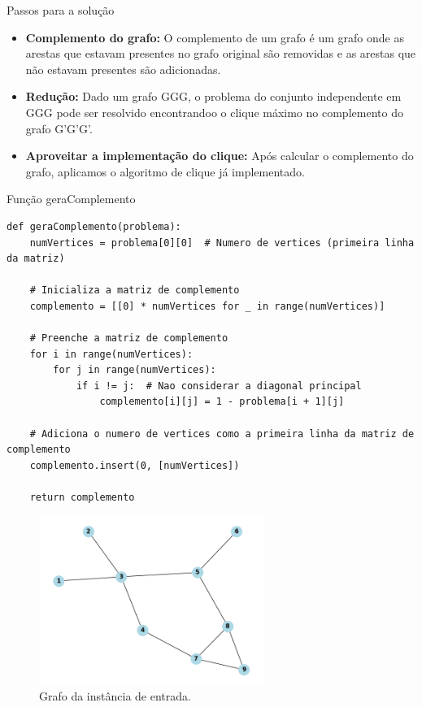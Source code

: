 \documentclass[compress,aspectratio=169]{beamer}
\begin{document}
    \begin{frame}{Passos para a solução}
        \begin{itemize}
            \item \textbf{Complemento do grafo:} O complemento de um grafo é um grafo onde as arestas que estavam presentes no grafo original são removidas e as arestas que não estavam presentes são adicionadas.
            \item \textbf{Redução:} Dado um grafo GGG, o problema do conjunto independente em GGG pode ser resolvido encontrandoo o clique máximo no complemento do grafo G'G'G'.
            \item \textbf{Aproveitar a implementação do clique:} Após calcular o complemento do grafo, aplicamos o algoritmo de clique já implementado.\\
        \end{itemize}
    \end{frame}

    \begin{frame}[fragile]{Função geraComplemento}
        \begin{lstlisting}
def geraComplemento(problema):
    numVertices = problema[0][0]  # Numero de vertices (primeira linha da matriz)
    
    # Inicializa a matriz de complemento
    complemento = [[0] * numVertices for _ in range(numVertices)]
    
    # Preenche a matriz de complemento
    for i in range(numVertices):
        for j in range(numVertices):
            if i != j:  # Nao considerar a diagonal principal
                complemento[i][j] = 1 - problema[i + 1][j]
    
    # Adiciona o numero de vertices como a primeira linha da matriz de complemento
    complemento.insert(0, [numVertices])
    
    return complemento
        \end{lstlisting}
    \end{frame}
    \begin{frame}
        \begin{figure}[H]
            \centering
            \includegraphics[width=0.65\textwidth]{images/grafo_instancia1.png}
            \caption{Grafo da instância de entrada.}
            \label{fig:instancia1}
        \end{figure}
    \end{frame} 
\end{document}
